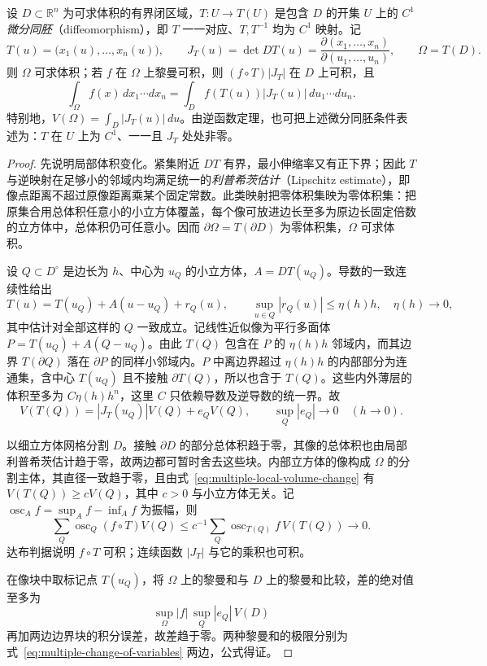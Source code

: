 \documentclass[UTF8,12pt,a4paper,fontset=fandol]{ctexbook}
\begin{document}
\begin{theorem}[重积分的变量替换公式]
\label{thm:multiple-change-of-variables}
设 $D\subset\mathbb R^n$ 为可求体积的有界闭区域，$T:U\to T(U)$ 是包含 $D$ 的开集 $U$ 上的 $C^1$ \emph{微分同胚}（diffeomorphism），即 $T$ 一一对应、$T,T^{-1}$ 均为 $C^1$ 映射。记
\[
    T(u)=\bigl(x_1(u),\ldots,x_n(u)\bigr),\qquad
    J_T(u)=\det DT(u)=\frac{\partial(x_1,\ldots,x_n)}{\partial(u_1,\ldots,u_n)},
    \qquad \Omega=T(D).
\]
则 $\Omega$ 可求体积；若 $f$ 在 $\Omega$ 上黎曼可积，则 $(f\circ T)|J_T|$ 在 $D$ 上可积，且
\begin{equation}
    \int_\Omega f(x)\,dx_1\cdots dx_n
    =\int_D f(T(u))|J_T(u)|\,du_1\cdots du_n.
    \label{eq:multiple-change-of-variables}
\end{equation}
特别地，$V(\Omega)=\int_D|J_T(u)|\,du$。由逆函数定理，也可把上述微分同胚条件表述为：$T$ 在 $U$ 上为 $C^1$、一一且 $J_T$ 处处非零。
\end{theorem}
\begin{proof}
先说明局部体积变化。紧集附近 $DT$ 有界，最小伸缩率又有正下界；因此 $T$ 与逆映射在足够小的邻域内均满足统一的\emph{利普希茨估计}（Lipschitz estimate），即像点距离不超过原像距离乘某个固定常数。此类映射把零体积集映为零体积集：把原集合用总体积任意小的小立方体覆盖，每个像可放进边长至多为原边长固定倍数的立方体中，总体积仍可任意小。因而 $\partial\Omega=T(\partial D)$ 为零体积集，$\Omega$ 可求体积。

设 $Q\subset D^\circ$ 是边长为 $h$、中心为 $u_Q$ 的小立方体，$A=DT(u_Q)$。导数的一致连续性给出
\[
    T(u)=T(u_Q)+A(u-u_Q)+r_Q(u),\qquad
    \sup_{u\in Q}|r_Q(u)|\leq\eta(h)h,\quad \eta(h)\to0,
\]
其中估计对全部这样的 $Q$ 一致成立。记线性近似像为平行多面体 $P=T(u_Q)+A(Q-u_Q)$。由此 $T(Q)$ 包含在 $P$ 的 $\eta(h)h$ 邻域内，而其边界 $T(\partial Q)$ 落在 $\partial P$ 的同样小邻域内。$P$ 中离边界超过 $\eta(h)h$ 的内部部分为连通集，含中心 $T(u_Q)$ 且不接触 $\partial T(Q)$，所以也含于 $T(Q)$。这些内外薄层的体积至多为 $C\eta(h)h^n$，这里 $C$ 只依赖导数及逆导数的统一界。故
\begin{equation}
    V(T(Q))=|J_T(u_Q)|V(Q)+e_QV(Q),
    \qquad \sup_Q|e_Q|\to0\quad(h\to0).
    \label{eq:multiple-local-volume-change}
\end{equation}

以细立方体网格分割 $D$。接触 $\partial D$ 的部分总体积趋于零，其像的总体积也由局部利普希茨估计趋于零，故两边都可暂时舍去这些块。内部立方体的像构成 $\Omega$ 的分割主体，其直径一致趋于零，且由式~\eqref{eq:multiple-local-volume-change} 有 $V(T(Q))\geq cV(Q)$，其中 $c>0$ 与小立方体无关。记 $\operatorname{osc}_Af=\sup_Af-\inf_Af$ 为振幅，则
\[
    \sum_Q\operatorname{osc}_Q(f\circ T)V(Q)
    \leq c^{-1}\sum_Q\operatorname{osc}_{T(Q)}f\,V(T(Q))\to0.
\]
达布判据说明 $f\circ T$ 可积；连续函数 $|J_T|$ 与它的乘积也可积。

在像块中取标记点 $T(u_Q)$，将 $\Omega$ 上的黎曼和与 $D$ 上的黎曼和比较，差的绝对值至多为
\[
    \sup_\Omega|f|\,\sup_Q|e_Q|\,V(D)
\]
再加两边边界块的积分误差，故差趋于零。两种黎曼和的极限分别为式~\eqref{eq:multiple-change-of-variables} 两边，公式得证。
\end{proof}
\end{document}
